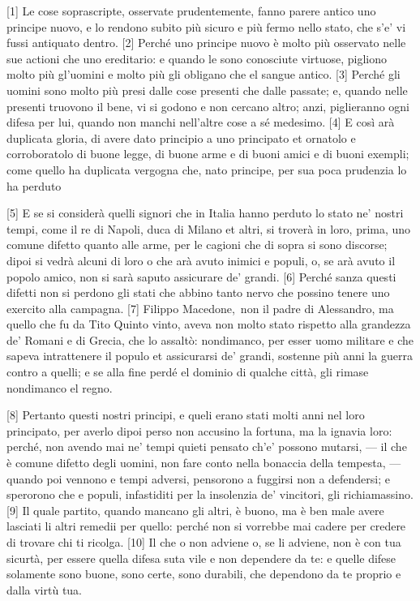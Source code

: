 {[}1{]} Le cose soprascripte, osservate prudentemente, fanno parere
antico uno principe nuovo, e lo rendono subito più sicuro e più fermo
nello stato, che s'e' vi fussi antiquato dentro. {[}2{]} Perché uno
principe nuovo è molto più osservato nelle sue actioni che uno
ereditario: e quando le sono conosciute virtuose, pigliono molto più
gl'uomini e molto più gli obligano che el sangue antico. {[}3{]} Perché
gli uomini sono molto più presi dalle cose presenti che dalle passate;
e, quando nelle presenti truovono il bene, vi si godono e non cercano
altro; anzi, piglieranno ogni difesa per lui, quando non manchi
nell'altre cose a sé medesimo. {[}4{]} E così arà duplicata gloria, di
avere dato principio a uno principato et ornatolo e corroboratolo di
buone legge, di buone arme e di buoni amici e di buoni exempli; come
quello ha duplicata vergogna che, nato principe, per sua poca prudenzia
lo ha perduto

{[}5{]} E se si considerà quelli signori che in Italia hanno perduto lo
stato ne' nostri tempi, come il re di Napoli, duca di Milano et altri,
si troverà in loro, prima, uno comune difetto quanto alle arme, per le
cagioni che di sopra si sono discorse; dipoi si vedrà alcuni di loro o
che arà avuto inimici e populi, o, se arà avuto il popolo amico, non si
sarà saputo assicurare de' grandi. {[}6{]} Perché sanza questi difetti
non si perdono gli stati che abbino tanto nervo che possino tenere uno
exercito alla campagna. {[}7{]} Filippo Macedone,\est\ non il padre di
Alessandro, ma quello che fu da Tito Quinto vinto, aveva non molto stato
rispetto alla grandezza de' Romani e di Grecia, che lo assaltò:
nondimanco, per esser uomo militare e che sapeva intrattenere il populo
et assicurarsi de' grandi, sostenne più anni la guerra contro a quelli;
e se alla fine perdé el dominio di qualche città, gli rimase nondimanco
el regno.

{[}8{]} Pertanto questi nostri principi, e queli erano stati molti anni
nel loro principato, per averlo dipoi perso non accusino la fortuna, ma
la ignavia loro: perché, non avendo mai ne' tempi quieti pensato ch'e'
possono mutarsi, --- il che è comune difetto degli uomini, non fare conto
nella bonaccia della tempesta, --- quando poi vennono e tempi adversi,
pensorono a fuggirsi non a defendersi; e sperorono che e populi,
infastiditi per la insolenzia de' vincitori, gli richiamassino. {[}9{]}
Il quale partito, quando mancano gli altri, è buono, ma è ben male avere
lasciati li altri remedii per quello: perché non si vorrebbe mai cadere
per credere di trovare chi ti ricolga. {[}10{]} Il che o non adviene o,
se li adviene, non è con tua sicurtà, per essere quella difesa suta vile
e non dependere da te: e quelle difese solamente sono buone, sono certe,
sono durabili, che dependono da te proprio e dalla virtù tua.

